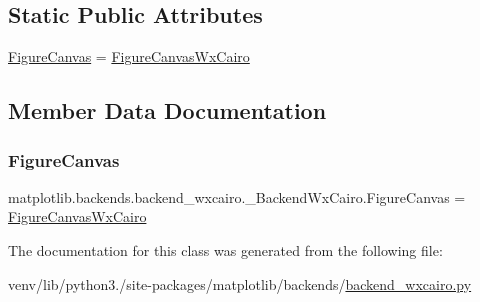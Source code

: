 \subsection*{Static Public Attributes}
\begin{DoxyCompactItemize}
\item 
\hyperlink{classmatplotlib_1_1backends_1_1backend__wxcairo_1_1__BackendWxCairo_a456a52f9fc79e078ae3eda7328014704}{Figure\+Canvas} = \hyperlink{classmatplotlib_1_1backends_1_1backend__wxcairo_1_1FigureCanvasWxCairo}{Figure\+Canvas\+Wx\+Cairo}
\end{DoxyCompactItemize}


\subsection{Member Data Documentation}
\mbox{\label{classmatplotlib_1_1backends_1_1backend__wxcairo_1_1__BackendWxCairo_a456a52f9fc79e078ae3eda7328014704}} 
\subsubsection{\texorpdfstring{Figure\+Canvas}{FigureCanvas}}
{\footnotesize\ttfamily matplotlib.\+backends.\+backend\+\_\+wxcairo.\+\_\+\+Backend\+Wx\+Cairo.\+Figure\+Canvas = \hyperlink{classmatplotlib_1_1backends_1_1backend__wxcairo_1_1FigureCanvasWxCairo}{Figure\+Canvas\+Wx\+Cairo}\hspace{0.3cm}{\ttfamily [static]}}



The documentation for this class was generated from the following file\+:\begin{DoxyCompactItemize}
\item 
venv/lib/python3./site-\/packages/matplotlib/backends/\hyperlink{backend__wxcairo_8py}{backend\+\_\+wxcairo.\+py}\end{DoxyCompactItemize}
